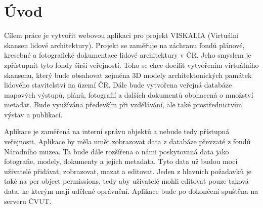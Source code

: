 \chapter*{Úvod}
\label{0-uvod}

Cílem práce je vytvořit webovou aplikaci pro projekt VISKALIA
(Virtuální skansen lidové architektury). Projekt se zaměřuje na
záchranu fondů plánové, kresebné a fotografické dokumentace lidové
architektury v ČR. Jeho smyslem je zpřístupnit tyto fondy širší
veřejnosti. Toho se chce docílit vytvořením virtuálního skansenu,
který bude obsahovat zejména 3D modely architektonických památek
lidového stavitelství na území ČR. Dále bude vytvořena veřejná
databáze mapových výstupů, plánů, fotografií a dalších dokumentů
obohacená o množství metadat. Bude využívána především při vzdělávání,
ale také prostřednictvím výstav a publikací.

Aplikace je zaměřená na interní správu objektů a nebude tedy přístupná
veřejnosti. Aplikace by měla umět zobrazovat data z databáze převzaté
z fondů Národního muzea. Ta bude dále rozšířena o námi poskytovaná
data jako fotografie, modely, dokumenty a jejich metadata. Tyto data
už budou moci uživatelé přidávat, zobrazovat, mazat a editovat. Jeden
z hlavních požadavků je také na per object permissions, tedy aby
uživatelé mohli editovat pouze taková data, ke kterým mají udělené
oprávnění. Aplikace bude po dokončení spuštěna na serveru ČVUT.


